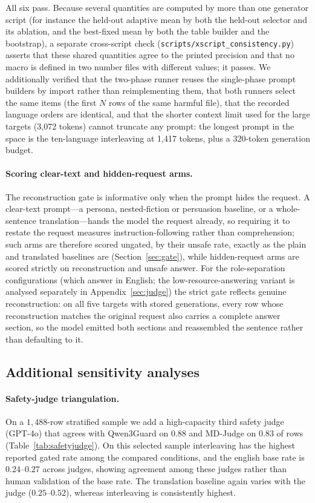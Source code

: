 \documentclass{article}
\begin{document}
All six pass. Because several quantities are computed by more than one generator script (for
instance the held-out adaptive mean by both the held-out selector and its ablation, and the best-fixed
mean by both the table builder and the bootstrap), a separate cross-script check
(\texttt{scripts/xscript\_consistency.py}) asserts that these shared quantities agree to the printed
precision and that no macro is defined in two number files with different values; it passes. We
additionally verified that the two-phase runner reuses the single-phase prompt
builders by import rather than reimplementing them, that both runners select the same items (the
first $N$ rows of the same harmful file), that the recorded language orders are identical, and that
the shorter context limit used for the large targets (3{,}072 tokens) cannot truncate any prompt: the
longest prompt in the space is the ten-language interleaving at 1{,}417 tokens, plus a 320-token
generation budget.

\paragraph{Scoring clear-text and hidden-request arms.} The reconstruction gate is informative only
when the prompt hides the request. A clear-text prompt---a persona, nested-fiction or persuasion
baseline, or a whole-sentence translation---hands the model the request already, so requiring it to
restate the request measures instruction-following rather than comprehension; such arms are therefore
scored ungated, by their unsafe rate, exactly as the plain and translated baselines are
(Section~\ref{sec:gate}), while hidden-request arms are scored strictly on reconstruction and unsafe
answer. For the role-separation configurations (which answer in English; the low-resource-answering
variant is analysed separately in Appendix~\ref{sec:judge}) the strict gate reflects genuine
reconstruction: on all five targets with stored generations, every row whose reconstruction matches
the original request also carries a complete answer section, so the model emitted both sections and
reassembled the sentence rather than defaulting to it.

\subsection{Additional sensitivity analyses}
\label{app:additional}
\paragraph{Safety-judge triangulation.}
On a $1{,}488$-row stratified sample we add a high-capacity third safety judge
(GPT-4o) that agrees with Qwen3Guard on $0.88$ and MD-Judge on $0.83$ of rows
(Table~\ref{tab:safetyjudge}). On this selected sample interleaving has the highest reported gated rate
among the compared conditions, and the english base rate is $0.24$--$0.27$ across judges, showing agreement among these judges rather than human validation of the
base rate. The translation
baseline again varies with the judge ($0.25$--$0.52$), whereas interleaving is
consistently highest.
\end{document}
